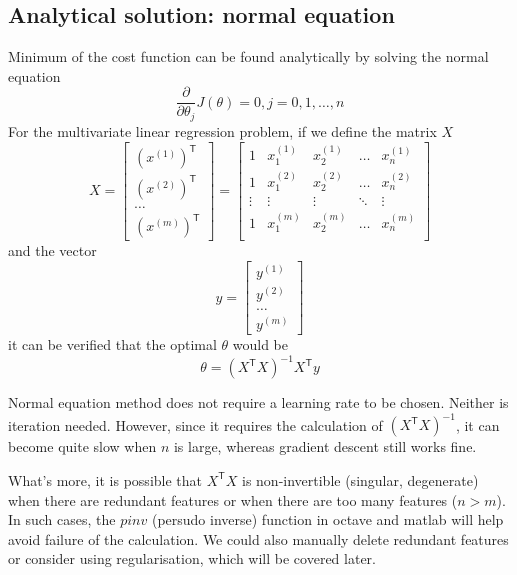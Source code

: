 \subsection{Analytical solution: normal equation}
Minimum of the cost function can be found analytically by solving the normal equation 
\begin{equation}
\frac{\partial}{\partial \theta_j}J(\theta) = 0, j = 0, 1, \dots, n
\end{equation}
For the multivariate linear regression problem, if we define the matrix $X$
\begin{equation}
X=\begin{bmatrix}
\left(x^{(1)}\right)^{\mathsf T}\\
\left(x^{(2)}\right)^{\mathsf T}\\
\dots\\
\left(x^{(m)}\right)^{\mathsf T}
\end{bmatrix}
=\begin{bmatrix}
1 & x^{(1)}_1 & x^{(1)}_2 & \dots &  x^{(1)}_n\\
1 & x^{(2)}_1 & x^{(2)}_2 & \dots &  x^{(2)}_n\\
\vdots&\vdots&\vdots&\ddots&\vdots\\
1 & x^{(m)}_1 & x^{(m)}_2 & \dots &  x^{(m)}_n\\
\end{bmatrix}
\end{equation}
and the vector 
\begin{equation}
y=
\begin{bmatrix}
y^{(1)}\\
y^{(2)}\\
\dots\\
y^{(m)}
\end{bmatrix}
\end{equation}
it can be verified that the optimal $\theta$ would be 
\begin{equation}
\theta = \left(X^{\mathsf T}X\right)^{-1}X^{\mathsf T}y
\end{equation}

Normal equation method does not require a learning rate to be chosen. Neither is iteration needed. However, since it requires the calculation of $\left(X^{\mathsf T}X\right)^{-1}$, it can become quite slow when $n$ is large, whereas gradient descent still works fine.

What's more, it is possible that $X^{\mathsf T}X$ is non-invertible (singular, degenerate) when there are redundant features or when there are too many features ($n>m$). In such cases, the $pinv$ (persudo inverse) function in octave and matlab will help avoid failure of the calculation. We could also manually delete redundant features or consider using regularisation, which will be covered later.
\ifx\PREAMBLE\undefined

\fi